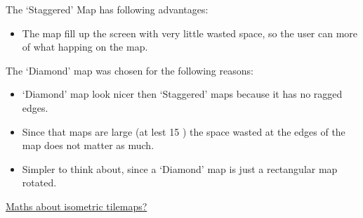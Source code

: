 The `Staggered' Map has following advantages:
\begin{itemize}
	\item The map fill up the screen with very little wasted space, so the user can more of what happing on the map.
\end{itemize} 

The `Diamond' map was chosen for the following reasons:
\begin{itemize}
	\item `Diamond' map look nicer then `Staggered' maps because it has no ragged edges.
	\item Since that maps are large (at lest 15 ) the space wasted at the edges of the map does not matter as much.
	\item Simpler to think about, since a `Diamond' map is just a rectangular map rotated.
\end{itemize}

\underline{Maths about isometric tilemaps? }
